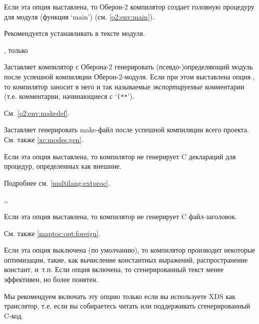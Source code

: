 \begin{description}
Если эта опция выставлена, то Оберон-2 компилятор создает 
головную процедуру для модуля
(функция `main')  (см. \ref{o2:env:main}).

Рекомендуется устанавливать в тексте модуля.

        \MLBegin{}\ModeC{}, только \ot{}\MLEnd{}

Заставляет компилятор с Оберона-2 генерировать (псевдо-)определяющий
модуль после успешной компиляции Оберон-2-модуля. Если при этом 
выставлена опция , то компилятор заносит в него и 
так называемые {\em экспортируемые} комментарии
(т.е. комментарии, начинающиеся с `\verb|(**|').

См. \ref{o2:env:makedef}.

        \MLBegin{}\ModeP{}\MLEnd{}

Заставляет \xds{} генерировать make-файл после успешной компиляции
всего проекта. См. также \ref{xc:modes:gen}.

\ifgenc
{}
        \MLBegin{}\ModeC{}\MLEnd{} \inline

Если эта опция выставлена, то компилятор не генерирует C деклараций
для процедур, определенных как внешние.

Подробнее см. \ref{multilang:extproc}.
\fi

\ifgenc
{}
        \MLBegin{}\ModeC{},\ModeM{},\ModeP{}\MLEnd{} \header


Если эта опция выставлена, то компилятор не генерирует C файл-заголовок.

См. также \ref{maptoc:opt:foreign}.
\fi

\ifgenc
{}
        \MLBegin{}\ModeC{}\MLEnd{}

Если эта опция выключена (по умолчанию), то компилятор производит
некоторые оптимизации, такие, как вычисление константных выражений,
распространение констант, и~т.п. Если опция включена, то сгенерированный
текст менее эффективен, но более понятен.

Мы рекомендуем включать эту опцию только если вы используете
XDS как транслятор, т.е. если вы собираетесь читать или поддерживать
сгенерированный C-код.
\fi

\ifgencode
{}
        \MLBegin{}\ModeC{}\MLEnd{} \header


\end{description}
